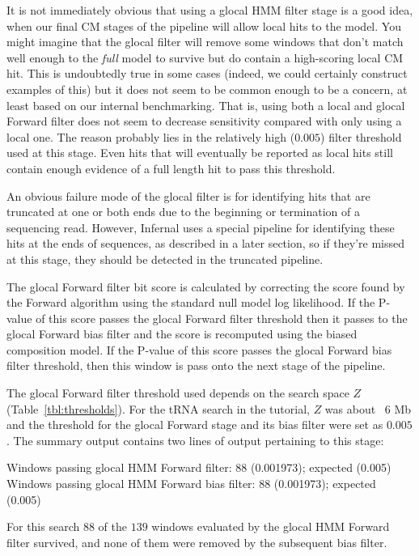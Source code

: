 \begin{sreoutput}
It is not immediately obvious that using a glocal HMM filter stage is
a good idea, when our final CM stages of the pipeline will allow local
hits to the model. You might imagine that the glocal filter will
remove some windows that don't match well enough to the \emph{full}
model to survive but do contain a high-scoring local CM hit. This is
undoubtedly true in some cases (indeed, we could certainly construct
examples of this) but it does not seem to be common enough to be a 
concern, at least based on our internal benchmarking. That is, using
both a local and glocal Forward filter does not seem to decrease
sensitivity compared with only using a local one. The reason probably
lies in the relatively high ($0.005$) filter threshold used at this
stage. Even hits that will eventually be reported as local hits still
contain enough evidence of a full length hit to pass this threshold.

An obvious failure mode of the glocal filter is for identifying 
hits that are truncated at one or both ends due to the beginning or
termination of a sequencing read. However, Infernal uses a special
pipeline for identifying these hits at the ends of sequences, as
described in a later section, so if they're missed at this stage, they
should be detected in the truncated pipeline.

The glocal Forward filter bit score is calculated by correcting the
score found by the Forward algorithm using the standard null model log
likelihood.  If the P-value of this score passes the glocal Forward
filter threshold then it passes to the glocal Forward bias filter and the
score is recomputed using the biased composition model. If the P-value
of this score passes the glocal Forward bias filter threshold, then this
window is pass onto the next stage of the pipeline.

The glocal Forward filter threshold used depends on
the search space $Z$ (Table~\ref{tbl:thresholds}). For the tRNA search
in the tutorial, $Z$ was about ~$6$ Mb and the threshold for the glocal
Forward stage and its bias filter were set as $0.005$. The summary
output contains two lines of output pertaining to this stage:

\begin{sreoutput}
Windows   passing glocal HMM Forward       filter:              88  (0.001973); expected (0.005)
Windows   passing glocal HMM Forward  bias filter:              88  (0.001973); expected (0.005)
\end{sreoutput}

For this search $88$ of the $139$ windows evaluated by the glocal HMM
Forward filter survived, and none of them were removed by the subsequent bias filter. 


\end{sreoutput}
